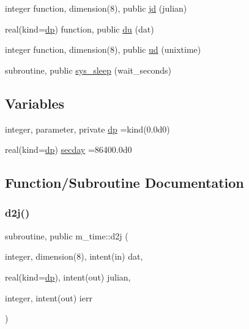 \begin{DoxyCompactItemize}
\item 
integer function, dimension(8), public \mbox{\hyperlink{namespacem__time_a6c3297c41c6f58f8139c48466a37f292}{jd}} (julian)
\item 
real(kind=\mbox{\hyperlink{namespacem__time_a95f16e7435244d114f0a451625dc189a}{dp}}) function, public \mbox{\hyperlink{namespacem__time_af1b675ed3256cd2ac10d461b8f1c7da8}{du}} (dat)
\item 
integer function, dimension(8), public \mbox{\hyperlink{namespacem__time_a8b2c0ede467ef5185d478a072a9f969f}{ud}} (unixtime)
\item 
subroutine, public \mbox{\hyperlink{namespacem__time_aeb65659c500dd201910f3615858f9b73}{sys\+\_\+sleep}} (wait\+\_\+seconds)
\end{DoxyCompactItemize}
\subsection*{Variables}
\begin{DoxyCompactItemize}
\item 
integer, parameter, private \mbox{\hyperlink{namespacem__time_a95f16e7435244d114f0a451625dc189a}{dp}} =kind(0.\+0d0)
\item 
real(kind=\mbox{\hyperlink{namespacem__time_a95f16e7435244d114f0a451625dc189a}{dp}}) \mbox{\hyperlink{namespacem__time_a2c21a39cf2aa1f48e7f03d3542c0fab2}{secday}} =86400.\+0d0
\end{DoxyCompactItemize}


\subsection{Function/\+Subroutine Documentation}
\mbox{\label{namespacem__time_a12cbfe4ebed008f4cdf88df4358df8ad}} 
\subsubsection{\texorpdfstring{d2j()}{d2j()}}
{\footnotesize\ttfamily subroutine, public m\+\_\+time\+::d2j (\begin{DoxyParamCaption}\item[{integer, dimension(8), intent(in)}]{dat,  }\item[{real(kind=\mbox{\hyperlink{namespacem__time_a95f16e7435244d114f0a451625dc189a}{dp}}), intent(out)}]{julian,  }\item[{integer, intent(out)}]{ierr }\end{DoxyParamCaption})}


